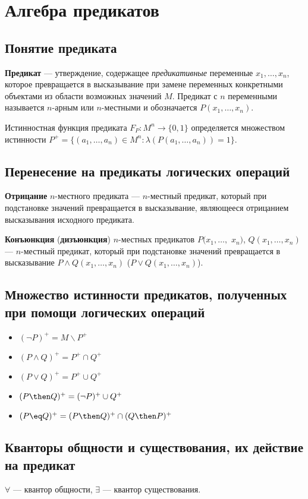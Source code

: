 \section{Алгебра предикатов}
\subsection{Понятие предиката}
\dftion \textbf{Предикат} --- утверждение, содержащее \textit{предикативные} переменные $x_1,\dots,x_n$, которое превращается в высказывание при замене переменных конкретными объектами из области возможных значений $M$. Предикат с $n$ переменными называется $n$-арным или $n$-местными и обозначается $P(x_1,\dots,x_n)$.

Истинностная функция предиката $F_P : M^n \to \{0,1\}$ определяется множеством истинности $P^+ = \{(a_1, \dots, a_n) \in M^n : \lambda(P(a_1,\dots,a_n)) = 1\}$.
\subsection{Перенесение на предикаты логических операций}
\dftion \textbf{Отрицание} $n$-местного предиката --- $n$-местный предикат, который при подстановке значений превращается в высказывание, являющееся отрицанием высказывания исходного предиката.

\dftion \textbf{Конъюнкция} (\textbf{дизъюнкция}) $n$-местных предикатов $P(x_1,\dots,$ $x_n)$, $Q(x_1,\dots,x_n)$ --- $n$-местный предикат, который при подстановке значений превращается в высказывание $P\land Q(x_1,\dots,x_n)$ \Big($P\lor Q(x_1,\dots,x_n)$\Big).

\subsection{Множество истинности предикатов, полученных при помощи логических операций}
\begin{itemize}
    \item $(\lnot P)^+ = M \backslash P^+$
    \item $(P \land Q)^+ = P^+ \cap Q^+$
    \item $(P \lor Q)^+ = P^+ \cup Q^+$
    \item $(P \then Q)^+ = (\lnot P)^+ \cup Q^+$
    \item $(P \eq Q)^+ = (P \then Q)^+ \cap (Q \then P)^+$
\end{itemize}

\subsection{Кванторы общности и существования, их действие на предикат}
\dftion $\forall$ --- квантор общности, $\exists$ --- квантор существования.


